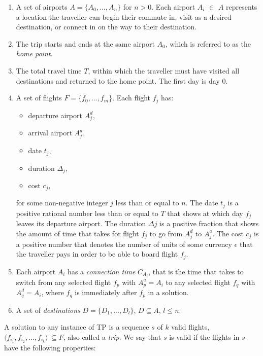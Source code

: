 \documentclass{mprop}
\theoremstyle{definition}
\begin{document}
\begin{enumerate}
\item A set of airports $A = \{ A_{0},...,A_{n} \}$ for $n > 0$. Each airport $A_{i}$ $\in$ $A$ represents a location the traveller can begin their commute in, visit as a desired destination, or connect in on the way to their destination.

\item The trip starts and ends at the same airport $A_{0}$, which is referred to as the \textit{home point}.

\item The total travel time $T$, within which the traveller must have visited all destinations and returned to the home point. The first day is day 0.
 
\item A set of flights $F = \{ f_{0},...,f_{m} \}$. Each flight $f_{j}$ has:
\begin{itemize}
\item departure airport $A^{d}_{j}$,
\item arrival airport $A^{a}_{j}$,
\item date $t_{j}$,
\item duration $\Delta_{j}$,
\item cost $c_{j}$,
\end{itemize} 
for some non-negative integer $j$ less than or equal to $n$.
The date $t_{j}$ is a positive rational number less than or equal to $T$ that shows at which day $f_{j}$ leaves its departure airport. The duration $\Delta{j}$ is a positive fraction that shows the amount of time that takes for flight $f_{j}$ to go from $A^{d}_{j}$ to $A^{a}_{j}$. The cost $c_{j}$ is a positive number that denotes the number of units of some currency $\epsilon$ that the traveller pays in order to be able to board flight $f_{j}$.

\item Each airport $A_{i}$ has a \textit{connection time} $C_{A_{i}}$, that is the time that takes to switch from any selected flight $f_{p}$ with $A^{a}_{p} = A_{i}$ to any selected flight $f_{q}$ with $A^{d}_{q} = A_{i}$, where $f_{q}$ is immediately after $f_{p}$ in a solution.

\item A set of \textit{destinations} $D = \{ D_{1},...,D_{l} \}$, $D \subseteq A$, $l \leq n$.
\end{enumerate}

A solution to any instance of TP is a sequence $s$ of $k$ valid flights, $ \langle f_{i_{1}}, f_{i_{2}},...,f_{i_{k}} \rangle \, \subseteq F$, also called a \textit{trip}. We say that $s$ is valid if the flights in $s$ have the following properties:
\end{document}
